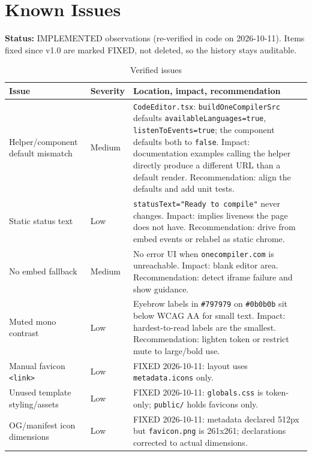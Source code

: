 \section{Known Issues}
\label{sec:known-issues}

\textbf{Status:} IMPLEMENTED observations (re-verified in code on 2026-10-11). Items fixed since v1.0 are marked FIXED, not deleted, so the history stays auditable.

\begin{table}[H]
\centering
\caption{Verified issues}
\begin{tabular}{|p{2.8cm}|l|p{7cm}|}
\hline
\textbf{Issue} & \textbf{Severity} & \textbf{Location, impact, recommendation} \\ \hline
Helper/component default mismatch & Medium & \texttt{CodeEditor.tsx}: \texttt{buildOneCompilerSrc} defaults \texttt{availableLanguages=true}, \texttt{listenToEvents=true}; the component defaults both to \texttt{false}. Impact: documentation examples calling the helper directly produce a different URL than a default render. Recommendation: align the defaults and add unit tests. \\ \hline
Static status text & Low & \texttt{statusText="Ready to compile"} never changes. Impact: implies liveness the page does not have. Recommendation: drive from embed events or relabel as static chrome. \\ \hline
No embed fallback & Medium & No error UI when \texttt{onecompiler.com} is unreachable. Impact: blank editor area. Recommendation: detect iframe failure and show guidance. \\ \hline
Muted mono contrast & Low & Eyebrow labels in \texttt{\#797979} on \texttt{\#0b0b0b} sit below WCAG AA for small text. Impact: hardest-to-read labels are the smallest. Recommendation: lighten token or restrict mute to large/bold use. \\ \hline
Manual favicon \texttt{<link>} & Low & FIXED 2026-10-11: layout uses \texttt{metadata.icons} only. \\ \hline
Unused template styling/assets & Low & FIXED 2026-10-11: \texttt{globals.css} is token-only; \texttt{public/} holds favicons only. \\ \hline
OG/manifest icon dimensions & Low & FIXED 2026-10-11: metadata declared 512px but \texttt{favicon.png} is 261x261; declarations corrected to actual dimensions. \\ \hline
\end{tabular}
\end{table}
